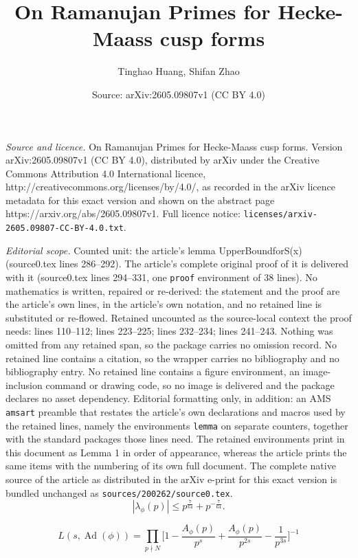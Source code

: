 \documentclass[10pt,a4paper]{amsart}
\title{On Ramanujan Primes for Hecke-Maass cusp forms}
\author{Tinghao Huang, Shifan Zhao}
\date{Source: arXiv:2605.09807v1 (CC BY 4.0)}
\newcommand{\Ad}{\operatorname{Ad}}
\begin{document}
\maketitle

\noindent\emph{Source and licence.} On Ramanujan Primes for Hecke-Maass cusp forms. Version arXiv:2605.09807v1 (CC BY 4.0), distributed by arXiv under the Creative Commons Attribution 4.0 International licence, http://creativecommons.org/licenses/by/4.0/, as recorded in the arXiv licence metadata for this exact version and shown on the abstract page https://arxiv.org/abs/2605.09807v1. Full licence notice: \texttt{licenses/arxiv-2605.09807-CC-BY-4.0.txt}.\par\smallskip

\noindent\textit{Editorial scope.} Counted unit: the article's lemma UpperBoundforS(x) (source0.tex lines 286--292). The article's complete original proof of it is delivered with it (source0.tex lines 294--331, one \texttt{proof} environment of 38 lines). No mathematics is written, repaired or re-derived: the statement and the proof are the article's own lines, in the article's own notation, and no retained line is substituted or re-flowed.  Retained uncounted as the source-local context the proof needs: lines 110--112; lines 223--225; lines 232--234; lines 241--243.  Nothing was omitted from any retained span, so the package carries no omission record.  No retained line contains a citation, so the wrapper carries no bibliography and no bibliography entry.  No retained line contains a figure environment, an image-inclusion command or drawing code, so no image is delivered and the package declares no asset dependency.  Editorial formatting only, in addition: an AMS \texttt{amsart} preamble that restates the article's own declarations and macros used by the retained lines, namely the environments \texttt{lemma} on separate counters, together with the standard packages those lines need.  The retained environments print in this document as Lemma 1 in order of appearance, whereas the article prints the same items with the numbering of its own full document.  The complete native source of the article as distributed in the arXiv e-print for this exact version is bundled unchanged as \texttt{sources/200262/source0.tex}.
\begin{equation}\label{KimSarnakboundforphi}
     |\lambda_{\phi}(p)| \leq p^{\frac{7}{64}} + p^{-\frac{7}{64}}.
\end{equation}

\begin{equation}\label{EulerProductofAd}
    L(s,\Ad(\phi)) = \prod_{p\nmid N}\bigg[1 - \frac{A_{\phi}(p)}{p^s} + \frac{A_{\phi}(p)}{p^{2s}} - \frac{1}{p^{3s}}\bigg]^{-1}
\end{equation}
\end{document}
